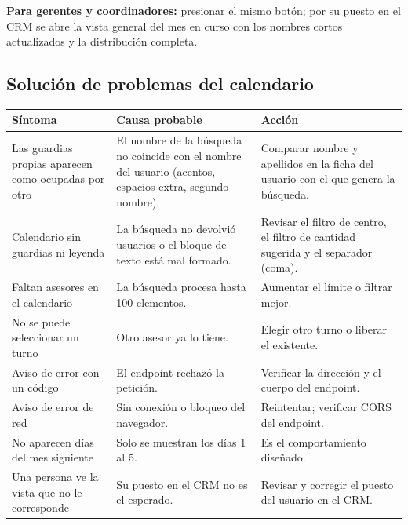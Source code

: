 \documentclass[11pt,a4paper]{article}
\begin{document}
\textbf{Para gerentes y coordinadores:} presionar el mismo botón; por su puesto en el CRM se abre la vista general del mes en curso con los nombres cortos actualizados y la distribución completa.

\subsection{Solución de problemas del calendario}
\begin{longtable}{@{}p{4.4cm}p{5cm}p{5.4cm}@{}}
\toprule
\textbf{Síntoma} & \textbf{Causa probable} & \textbf{Acción} \\
\midrule
\endhead
Las guardias propias aparecen como ocupadas por otro & El nombre de la búsqueda no coincide con el nombre del usuario (acentos, espacios extra, segundo nombre). & Comparar nombre y apellidos en la ficha del usuario con el que genera la búsqueda. \\
Calendario sin guardias ni leyenda & La búsqueda no devolvió usuarios o el bloque de texto está mal formado. & Revisar el filtro de centro, el filtro de cantidad sugerida y el separador (coma). \\
Faltan asesores en el calendario & La búsqueda procesa hasta 100 elementos. & Aumentar el límite o filtrar mejor. \\
No se puede seleccionar un turno & Otro asesor ya lo tiene. & Elegir otro turno o liberar el existente. \\
Aviso de error con un código & El endpoint rechazó la petición. & Verificar la dirección y el cuerpo del endpoint. \\
Aviso de error de red & Sin conexión o bloqueo del navegador. & Reintentar; verificar CORS del endpoint. \\
No aparecen días del mes siguiente & Solo se muestran los días 1 al 5. & Es el comportamiento diseñado. \\
Una persona ve la vista que no le corresponde & Su puesto en el CRM no es el esperado. & Revisar y corregir el puesto del usuario en el CRM. \\
\bottomrule
\end{longtable}
\end{document}
